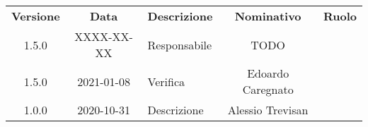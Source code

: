 {
    \renewcommand{\arraystretch}{1.5}
    \centering
    \begin{longtable}{ c c  C{4cm}  c  c }
        \rowcolor{\primaryColor}
        \textcolor{\secondaryColor}{
        \textbf{Versione}}     & \textcolor{\secondaryColor}{\textbf{Data}}       & \textcolor{\secondaryColor}
        {\textbf{Descrizione}} & \textcolor{\secondaryColor}{\textbf{Nominativo}} & \textcolor{\secondaryColor}{\textbf{Ruolo}}                          \\


        1.5.0                  & XXXX-XX-XX                                       & Responsabile                                & TODO & \responsabile{} \\
        1.5.0                  & 2021-01-08                                       & Verifica                                    & Edoardo Caregnato & \verificatore{} \\
        1.0.0                  & 2020-10-31                                      & Descrizione                           & Alessio Trevisan & \redattore{}    \\
    \end{longtable}
}